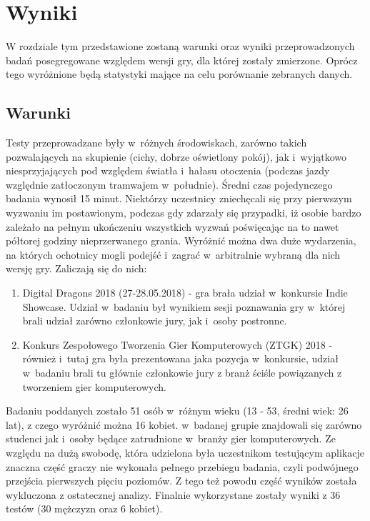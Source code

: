 \documentclass[a4paper,12pt,numbers=noenddot]{report}
\begin{document}
\chapter{Wyniki}
W rozdziale tym przedstawione zostaną warunki oraz wyniki przeprowadzonych badań posegregowane względem wersji gry, dla której zostały zmierzone. Oprócz tego wyróżnione będą statystyki mające na celu porównanie zebranych danych.

\section{Warunki}
Testy przeprowadzane były w~różnych środowiskach, zarówno takich pozwalających na skupienie (cichy, dobrze oświetlony pokój), jak i~wyjątkowo niesprzyjających pod względem światła i~hałasu otoczenia (podczas jazdy względnie zatłoczonym tramwajem w~południe). Średni czas pojedynczego badania wynosił 15 minut. Niektórzy uczestnicy zniechęcali się przy pierwszym wyzwaniu im postawionym, podczas gdy zdarzały się przypadki, iż osobie bardzo zależało na pełnym ukończeniu wszystkich wyzwań poświęcając na to nawet półtorej godziny nieprzerwanego grania. Wyróżnić można dwa duże wydarzenia, na których ochotnicy mogli podejść i~zagrać w~arbitralnie wybraną dla nich wersję gry. Zaliczają się do nich:
\begin{enumerate}
\item Digital Dragons 2018 (27-28.05.2018) - gra brała udział w~konkursie Indie Showcase. Udział w~badaniu był wynikiem sesji poznawania gry w~której brali udział zarówno członkowie jury, jak i~osoby postronne.
\item Konkurs Zespołowego Tworzenia Gier Komputerowych (ZTGK) 2018 - również i~tutaj gra była prezentowana jaka pozycja w~konkursie, udział w~badaniu brali tu głównie członkowie jury z branż ściśle powiązanych z tworzeniem gier komputerowych.
\end{enumerate}
Badaniu poddanych zostało 51 osób w~różnym wieku (13 - 53, średni wiek: 26 lat), z czego wyróżnić można 16 kobiet. w~badanej grupie znajdowali się zarówno studenci jak i~osoby będące zatrudnione w~branży gier komputerowych. Ze względu na dużą swobodę, która udzielona była uczestnikom testującym aplikacje znaczna część graczy nie wykonała pełnego przebiegu badania, czyli podwójnego przejścia pierwszych pięciu poziomów. Z tego też powodu część wyników została wykluczona z ostatecznej analizy. Finalnie wykorzystane zostały wyniki z 36 testów (30 mężczyzn oraz 6 kobiet).
\end{document}
